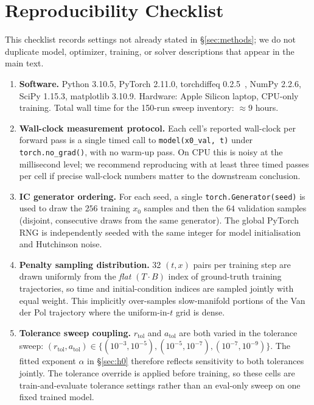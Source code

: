 \section{Reproducibility Checklist}
\label{app:reproducibility}

This checklist records settings not already stated in \S\ref{sec:methods}; we
do not duplicate model, optimizer, training, or solver descriptions that
appear in the main text.

\begin{enumerate}[leftmargin=2em]
\item \textbf{Software.} Python 3.10.5, PyTorch 2.11.0, torchdiffeq
0.2.5~\citep{chen2018torchdiffeq}, NumPy 2.2.6, SciPy 1.15.3,
matplotlib 3.10.9. Hardware: Apple Silicon laptop, CPU-only training.
Total wall time for the 150-run sweep inventory: $\approx 9$ hours.
\item \textbf{Wall-clock measurement protocol.} Each cell's reported
wall-clock per forward pass is a single timed call to
\texttt{model(x0\_val, t)} under \texttt{torch.no\_grad()}, with no warm-up
pass. On CPU this is noisy at the millisecond level; we recommend
reproducing with at least three timed passes per cell if precise wall-clock
numbers matter to the downstream conclusion.
\item \textbf{IC generator ordering.} For each seed, a single
\texttt{torch.Generator(seed)} is used to draw the $256$ training $x_0$
samples and then the $64$ validation samples (disjoint, consecutive draws
from the same generator). The global PyTorch RNG is independently seeded
with the same integer for model initialisation and Hutchinson noise.
\item \textbf{Penalty sampling distribution.} 32 $(t, x)$ pairs per training
step are drawn uniformly from the \emph{flat} $(T \cdot B)$ index of
ground-truth training trajectories, so time and initial-condition indices
are sampled jointly with equal weight. This implicitly over-samples
slow-manifold portions of the Van der Pol trajectory where the
uniform-in-$t$ grid is dense.
\item \textbf{Tolerance sweep coupling.} $r_\text{tol}$ and $a_\text{tol}$
are both varied in the tolerance sweep:
$(r_\text{tol}, a_\text{tol}) \in \{(10^{-3}, 10^{-5}), (10^{-5}, 10^{-7}),
(10^{-7}, 10^{-9})\}$. The fitted exponent $\alpha$ in \S\ref{sec:h0}
therefore reflects sensitivity to both tolerances jointly. The tolerance
override is applied before training, so these cells are train-and-evaluate
tolerance settings rather than an eval-only sweep on one fixed trained model.

\end{enumerate}
